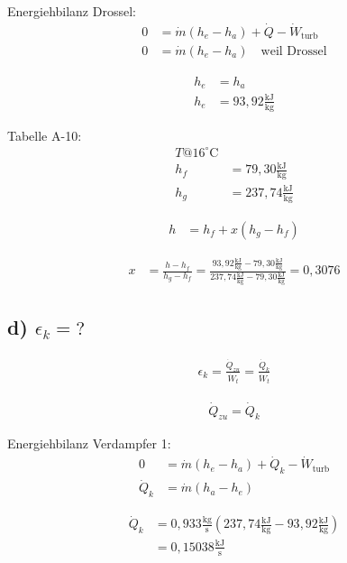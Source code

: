 Energiehbilanz Drossel:
\begin{align*}
0 &= \dot{m} (h_e - h_a) + \dot{Q} - \dot{W}_{\text{turb}} \\
0 &= \dot{m} (h_e - h_a) \quad \text{weil Drossel}
\end{align*}

\begin{align*}
h_e &= h_a \\
h_e &= 93{,}92 \frac{\text{kJ}}{\text{kg}}
\end{align*}

Tabelle A-10:
\begin{align*}
T @ 16^\circ \text{C} \\
h_f &= 79{,}30 \frac{\text{kJ}}{\text{kg}} \\
h_g &= 237{,}74 \frac{\text{kJ}}{\text{kg}}
\end{align*}

\begin{align*}
h &= h_f + x (h_g - h_f)
\end{align*}

\begin{align*}
x &= \frac{h - h_f}{h_g - h_f} = \frac{93{,}92 \frac{\text{kJ}}{\text{kg}} - 79{,}30 \frac{\text{kJ}}{\text{kg}}}{237{,}74 \frac{\text{kJ}}{\text{kg}} - 79{,}30 \frac{\text{kJ}}{\text{kg}}} = 0{,}3076
\end{align*}

\subsection*{d) $\epsilon_k = ?$}

\begin{align*}
\epsilon_k = \frac{\dot{Q}_{zu}}{\dot{W}_{t}} = \frac{\dot{Q}_{k}}{\dot{W}_{t}}
\end{align*}

\begin{align*}
\dot{Q}_{zu} = \dot{Q}_{k}
\end{align*}

Energiehbilanz Verdampfer 1:
\begin{align*}
0 &= \dot{m} (h_e - h_a) + \dot{Q}_{k} - \dot{W}_{\text{turb}} \\
\dot{Q}_{k} &= \dot{m} (h_a - h_e)
\end{align*}

\begin{align*}
\dot{Q}_{k} &= 0{,}933 \frac{\text{kg}}{\text{s}} (237{,}74 \frac{\text{kJ}}{\text{kg}} - 93{,}92 \frac{\text{kJ}}{\text{kg}}) \\
&= 0{,}15038 \frac{\text{kJ}}{\text{s}}
\end{align*}

